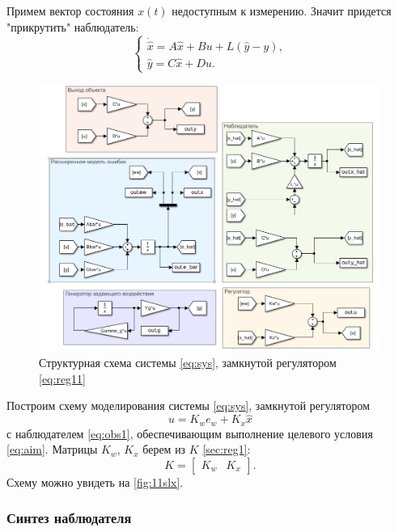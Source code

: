 Примем вектор состояния $x(t)$ недоступным к измерению. Значит придется 
"прикрутить" наблюдатель:
\begin{equation}
    \label{eq:obs1}
    \begin{cases}
        \dot{\hat x}=A\hat x+Bu+L(\hat y - y),\\
        \hat y=C\hat x+Du.
    \end{cases}
\end{equation}
\begin{figure}[H]
    \centering
    \includegraphics[width=\linewidth]{figs/1_1_slx.png}
    \caption{Структурная схема системы \eqref{eq:sys}, замкнутой регулятором
    \eqref{eq:reg11}}
    \label{fig:11slx}
\end{figure}
\noindent Построим схему моделирования системы \eqref{eq:sys}, замкнутой регулятором
\begin{equation}
    \label{eq:reg11}
    u=K_we_w+K_x\hat x
\end{equation}
с наблюдателем \eqref{eq:obs1},
обеспечивающим выполнение целевого условия \eqref{eq:aim}. Матрицы $K_w$, $K_x$
берем из $K$ \autoref{sec:reg1}:
\begin{equation*}
    K=\begin{bmatrix}
        K_w & K_x
    \end{bmatrix}.
\end{equation*}
Схему можно увидеть на \autoref{fig:11slx}. 

\subsubsection{Синтез наблюдателя}
\label{eq:obs}


